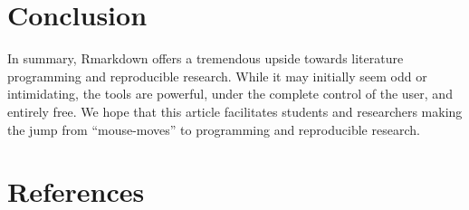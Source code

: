 \documentclass[]{elsarticle} %
\begin{document}
\hypertarget{conclusion}{%
\section{Conclusion}\label{conclusion}}

In summary, Rmarkdown offers a tremendous upside towards literature
programming and reproducible research. While it may initially seem odd
or intimidating, the tools are powerful, under the complete control of
the user, and entirely free. We hope that this article facilitates
students and researchers making the jump from ``mouse-moves'' to
programming and reproducible research.

\hypertarget{references}{%
\section*{References}\label{references}}
\end{document}
